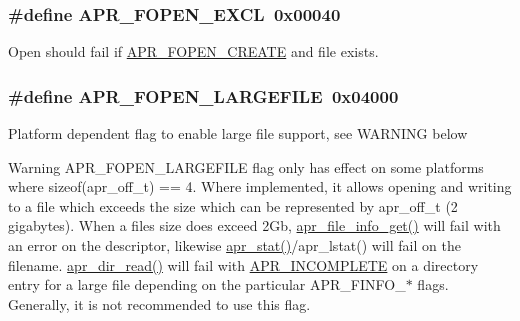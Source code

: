 \subsubsection[{\texorpdfstring{A\+P\+R\+\_\+\+F\+O\+P\+E\+N\+\_\+\+E\+X\+CL}{APR_FOPEN_EXCL}}]{\setlength{\rightskip}{0pt plus 5cm}\#define A\+P\+R\+\_\+\+F\+O\+P\+E\+N\+\_\+\+E\+X\+CL~0x00040}\hypertarget{group__apr__file__open__flags_gabb7fb062cdf1d58faee8c7ea518496f1}{}\label{group__apr__file__open__flags_gabb7fb062cdf1d58faee8c7ea518496f1}
Open should fail if \hyperlink{group__apr__file__open__flags_gafe94f21ccbf411172e70e7f473af251a}{A\+P\+R\+\_\+\+F\+O\+P\+E\+N\+\_\+\+C\+R\+E\+A\+TE} and file exists. 
\subsubsection[{\texorpdfstring{A\+P\+R\+\_\+\+F\+O\+P\+E\+N\+\_\+\+L\+A\+R\+G\+E\+F\+I\+LE}{APR_FOPEN_LARGEFILE}}]{\setlength{\rightskip}{0pt plus 5cm}\#define A\+P\+R\+\_\+\+F\+O\+P\+E\+N\+\_\+\+L\+A\+R\+G\+E\+F\+I\+LE~0x04000}\hypertarget{group__apr__file__open__flags_gaf6cfaa4789e6264afd186235f0adbc22}{}\label{group__apr__file__open__flags_gaf6cfaa4789e6264afd186235f0adbc22}
Platform dependent flag to enable large file support, see W\+A\+R\+N\+I\+NG below

\begin{DoxyWarning}{Warning}
A\+P\+R\+\_\+\+F\+O\+P\+E\+N\+\_\+\+L\+A\+R\+G\+E\+F\+I\+LE flag only has effect on some platforms where sizeof(apr\+\_\+off\+\_\+t) == 4. Where implemented, it allows opening and writing to a file which exceeds the size which can be represented by apr\+\_\+off\+\_\+t (2 gigabytes). When a file\textquotesingle{}s size does exceed 2\+Gb, \hyperlink{group__apr__file__io_ga39be7fe05d0dda4a28f4358b61a44ac8}{apr\+\_\+file\+\_\+info\+\_\+get()} will fail with an error on the descriptor, likewise \hyperlink{group__apr__file__stat_gafb0f4a4fa4545c155e20ddd8f2001c1a}{apr\+\_\+stat()}/apr\+\_\+lstat() will fail on the filename. \hyperlink{group__apr__dir_ga3e4ee253e0c712160bee10bfb9c8e4a8}{apr\+\_\+dir\+\_\+read()} will fail with \hyperlink{group___a_p_r___error_ga64dff43b83bcefd3f3c751be6b864ca1}{A\+P\+R\+\_\+\+I\+N\+C\+O\+M\+P\+L\+E\+TE} on a directory entry for a large file depending on the particular A\+P\+R\+\_\+\+F\+I\+N\+F\+O\+\_\+$\ast$ flags. Generally, it is not recommended to use this flag. 
\end{DoxyWarning}
